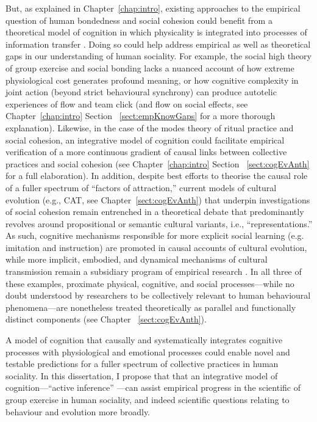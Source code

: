 \begin{CJK}{UTF8}{gbsn}
But, as explained in Chapter~\ref{chap:intro}, existing approaches to the empirical question of human bondedness and social cohesion could benefit from a theoretical model of cognition in which physicality is integrated into processes of information transfer \citep{Yufik2017}.  Doing so could help address empirical as well as theoretical gaps in our understanding of human sociality.  For example,  the social high theory of group exercise and social bonding \citep[cf.][]{Cohen2017} lacks a nuanced account of how extreme physiological cost generates profound meaning, or how cognitive complexity in joint action (beyond strict behavioural synchrony) can produce autotelic experiences of flow and team click (and flow on social effects, see Chapter~\ref{chap:intro} Section ~\ref{sect:empKnowGaps} for a more thorough explanation).  Likewise, in the case of the modes theory of ritual practice and social cohesion, an integrative model of cognition could facilitate empirical verification of a more continuous gradient of causal links between collective practices and social cohesion (see Chapter~\ref{chap:intro} Section ~\ref{sect:cogEvAnth} for a full elaboration).
In addition, despite best efforts to theorise the causal role of a fuller spectrum of ``factors of attraction,'' current models of cultural evolution (e.g., CAT, see Chapter~\ref{sect:cogEvAnth}) that underpin investigations of social cohesion remain entrenched in a theoretical debate that predominantly revolves around propositional or semantic cultural variants, i.e., ``representations.'' As such, cognitive mechanisms responsible for more explicit social learning (e.g. imitation and instruction) are promoted in causal accounts of cultural evolution, while more implicit, embodied, and dynamical mechanisms of cultural transmission remain a subsidiary program of empirical research  \citep{Lerique2016}.  In all three of these examples, proximate physical, cognitive, and social processes---while no doubt understood by researchers to be collectively relevant to human behavioural phenomena---are nonetheless treated theoretically as parallel and functionally distinct components (see Chapter ~\ref{sect:cogEvAnth}).

A model of cognition that causally and systematically integrates cognitive processes with physiological and emotional processes could enable novel and testable predictions for a fuller spectrum of collective practices in human sociality.  In this dissertation, I propose that that an integrative model of cognition---``active inference'' \citep{Friston2010}---can assist empirical progress in the scientific of group exercise in human sociality, and indeed scientific questions relating to behaviour and evolution more broadly.


\end{CJK}
